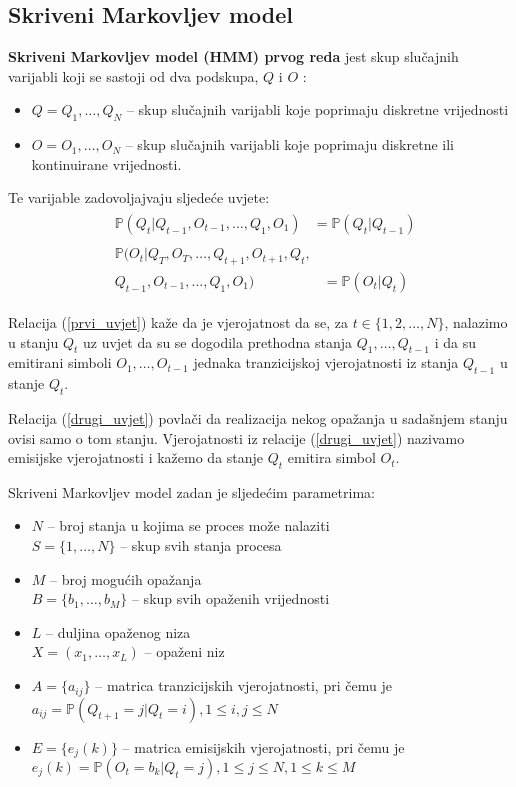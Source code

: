 \documentclass[conference]{IEEEtran}
\begin{document}
	\subsection{Skriveni Markovljev model}
		\textbf{Skriveni Markovljev model (HMM) prvog reda} jest skup slučajnih varijabli koji se sastoji od dva podskupa, $Q$ i $O$ :
		\begin{itemize}
		\item $Q = Q_1, \ldots , Q_N$ -- skup slučajnih varijabli koje poprimaju diskretne vrijednosti
		\item $O = O_1, \ldots , O_N$ -- skup slučajnih varijabli koje poprimaju diskretne ili kontinuirane vrijednosti.
		\end{itemize}
		Te varijable zadovoljajvaju sljedeće uvjete:
		\begin{align}
			&\begin{aligned}\label{prvi_uvjet}
				\mathbb{P}(Q_t|Q_{t-1},O_{t-1}, \ldots, Q_{1},O_{1}) &= \mathbb{P} ( Q_{t}|Q_{t-1})
			\end{aligned}\\
			&\begin{aligned}\label{drugi_uvjet}
				\mathbb{P}(O_t|Q_T,O_T, \ldots, Q_{t+1},O_{t+1},Q_t,\\Q_{t-1},O_{t-1},\ldots, Q_{1},O_{1}) &= \mathbb{P} ( O_{t}|Q_{t}) 
			\end{aligned}
		\end{align}
		
		
		Relacija (\ref{prvi_uvjet}) kaže da je vjerojatnost da se, za $ t \in \{1,2,\ldots , N \}$, nalazimo u stanju $Q_t$ uz uvjet da su se dogodila prethodna stanja $Q_1, \ldots, Q_{t-1} $ i da su emitirani simboli $O_1, \ldots , O_{t-1} $ jednaka tranzicijskoj vjerojatnosti iz stanja $Q_{t-1}$ u stanje $Q_t$.
		
		Relacija (\ref{drugi_uvjet}) povlači da realizacija nekog opažanja u sadašnjem stanju ovisi samo o tom stanju. Vjerojatnosti iz relacije (\ref{drugi_uvjet}) nazivamo emisijske vjerojatnosti i kažemo da stanje $Q_t$ emitira simbol $O_t$. 
		
		Skriveni Markovljev model zadan je sljedećim parametrima:
		\begin{itemize}
			\item $N$ -- broj stanja u kojima se proces može nalaziti \\
					$ S = \{1, \ldots, N\}$ -- skup svih stanja procesa
			\item $M$ -- broj mogućih opažanja\\
					$B = \{ b_1, \ldots, b_M\}$ -- skup svih opaženih vrijednosti
			\item $L$ -- duljina opaženog niza\\
					$X=(x_1,\ldots , x_L)$ -- opaženi niz 
			\item $A = \{a_{ij}\}$ -- matrica tranzicijskih vjerojatnosti, pri čemu je 
			$a_{ij} = \mathbb{P}(Q_{t+1} = j | Q_t = i ) , 1 \leq i,j \leq N$
			\item $E = \{e_{j}(k)\}$ -- matrica emisijskih vjerojatnosti, pri čemu je $e_j(k) = \mathbb{P} ( O_t = b_k | Q_t = j) , 1 \leq j \leq N , 1 \leq k \leq M$ 
		\end{itemize}
\end{document}
